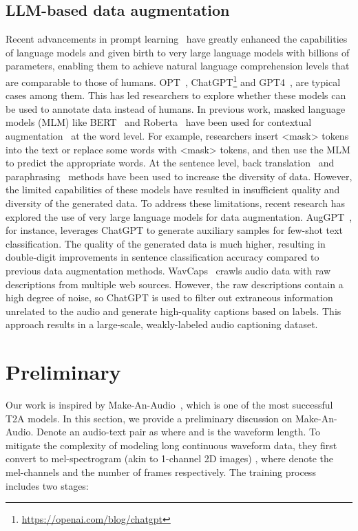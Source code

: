 \documentclass{article}
\begin{document}
\subsection{LLM-based data augmentation}
Recent advancements in prompt learning~\cite{liu2021pretrain} have greatly enhanced the capabilities of language models and given birth to very large language models with billions of parameters, enabling them to achieve natural language comprehension levels that are comparable to those of humans. OPT~\cite{zhang2022opt}, ChatGPT\footnote[1]{\url{https://openai.com/blog/chatgpt}} and GPT4~\cite{openai2023gpt4}, are typical cases among them. This has led researchers to explore whether these models can be used to annotate data instead of humans. In previous work, masked language models (MLM) like BERT~\cite{devlin2018bert} and Roberta~\cite{liu2019roberta} have been used for contextual augmentation~\cite{kumar2021data} at the word level. For example, researchers insert <mask> tokens into the text or replace some words with <mask> tokens, and then use the MLM to predict the appropriate words. At the sentence level, back translation~\cite{sennrich2015improving} and paraphrasing~\cite{kumar2019submodular} methods have been used to increase the diversity of data. However, the limited capabilities of these models have resulted in insufficient quality and diversity of the generated data.
To address these limitations, recent research has explored the use of very large language models for data augmentation. AugGPT~\cite{dai2023auggpt}, for instance, leverages ChatGPT to generate auxiliary samples for few-shot text classification. The quality of the generated data is much higher, resulting in double-digit improvements in sentence classification accuracy compared to previous data augmentation methods. WavCaps~\cite{mei2023wavcaps} crawls audio data with raw descriptions from multiple web sources. However, the raw descriptions contain a high degree of noise, so ChatGPT is used to filter out extraneous information unrelated to the audio and generate high-quality captions based on labels. This approach results in a large-scale, weakly-labeled audio captioning dataset.

 \section{Preliminary}
Our work is inspired by Make-An-Audio~\cite{huang2023makeanaudio}, which is one of the most successful T2A models. In this section, we provide a preliminary discussion on Make-An-Audio. Denote an audio-text pair as  where  and  is the waveform length. To mitigate the complexity of modeling long continuous waveform data, they first convert  to mel-spectrogram (akin to 1-channel 2D images) , where  denote the mel-channels and the number of frames respectively. The training process includes two stages:
  
\end{document}
